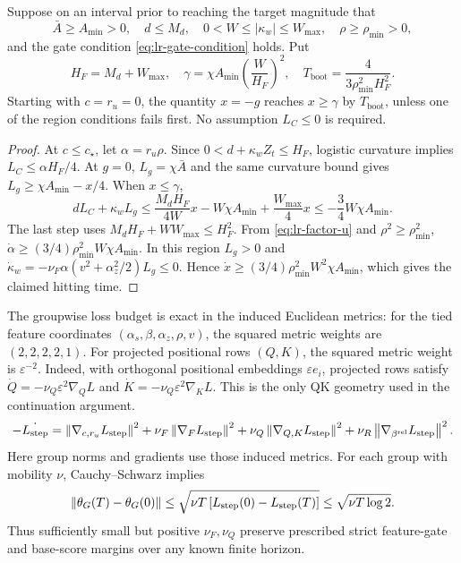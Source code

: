 \begin{lrlemma}
\label{lem:lr-feature-bootstrap}
Suppose on an interval prior to reaching the target magnitude that
\begin{equation}\label{eq:lr-amplification-region}
 \bar A\ge A_{\min}>0,\quad
 d\le M_d,\quad
 0<W\le|\kappa_w|\le W_{\max},\quad
 \rho\ge\rho_{\min}>0,
\end{equation}
and the gate condition \eqref{eq:lr-gate-condition} holds.  Put
\begin{equation}\label{eq:lr-gamma-bootstrap}
 H_F=M_d+W_{\max},\quad
 \gamma=\chi A_{\min}\left(\frac W{H_F}\right)^2,
 \quad
 T_{\mathrm{boot}}=\frac4{3\rho_{\min}^2H_F^2}.
\end{equation}
Starting with $c=r_u=0$, the quantity $x=-g$ reaches $x\ge\gamma$
by $T_{\mathrm{boot}}$, unless one of the region conditions fails first.
No assumption $L_C\le0$ is required.
\end{lrlemma}
\begin{proof}
At $c\le c_\star$, let $\alpha=r_u\rho$.  Since
$0<d+\kappa_w Z_t\le H_F$, logistic curvature implies
$L_C\le\alpha H_F/4$.  At $g=0$, $L_g=\chi\bar A$ and the
same curvature bound gives $L_g\ge\chi A_{\min}-x/4$.
When $x\le\gamma$,
\[
 dL_C+\kappa_w L_g
 \le\frac{M_d H_F}{4W}x-W\chi A_{\min}
 +\frac{W_{\max}}4x
 \le-\frac34W\chi A_{\min}.
\]
The last step uses
$M_d H_F+WW_{\max}\le H_F^2$.
From \eqref{eq:lr-factor-u} and
$\rho^2\ge\rho_{\min}^2$,
$\dot\alpha\ge(3/4)\rho_{\min}^2W\chi A_{\min}$.
In this region $L_g>0$ and
$\dot \kappa_w=-\nu_F\alpha(v^2+\alpha_z^2/2)L_g\le0$.
Hence $\dot x\ge(3/4)\rho_{\min}^2W^2\chi A_{\min}$,
which gives the claimed hitting time.
\end{proof}

The groupwise loss budget is exact in the induced Euclidean metrics:
for the tied feature coordinates $(\alpha_s,\beta,\alpha_z,\rho,v)$, the squared
metric weights are $(2,2,2,2,1)$. For projected positional rows $(Q,K)$,
the squared metric weight is $\varepsilon^{-2}$.
Indeed, with orthogonal positional embeddings $\varepsilon e_i$,
projected rows satisfy $\dot Q=-\nu_Q\varepsilon^2\nabla_Q L$ and
$\dot K=-\nu_Q\varepsilon^2\nabla_K L$. This is the only QK geometry
used in the continuation argument.
\begin{equation}\label{eq:lr-mobility-budget}
 -\dot{L_{\mathrm{step}}}=
 \left\lVert \nabla_{c,r_u}L_{\mathrm{step}}\right\rVert^2
 +\nu_F\left\lVert \nabla_FL_{\mathrm{step}}\right\rVert^2
 +\nu_Q\left\lVert \nabla_{Q,K}L_{\mathrm{step}}\right\rVert^2
 +\nu_R\left\lVert \nabla_{\beta^{\mathrm{rel}}}L_{\mathrm{step}}\right\rVert^2.
\end{equation}
Here group norms and gradients use those induced metrics. For each group
with mobility $\nu$, Cauchy--Schwarz implies
\begin{equation}\label{eq:lr-movement-budget}
 \left\lVert \theta_G(T)-\theta_G(0)\right\rVert
 \le\sqrt{\nu T\,[L_{\mathrm{step}}(0)-L_{\mathrm{step}}(T)]}
 \le\sqrt{\nu T\log2}.
\end{equation}
Thus sufficiently small but positive $\nu_F,\nu_Q$ preserve prescribed
strict feature-gate and base-score margins over any known finite horizon.


